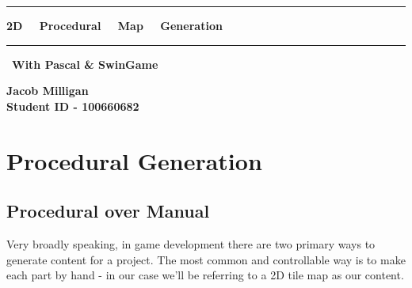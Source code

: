 \documentclass{article}
\begin{document}
\begin{titlepage}

\centering
\vspace*{0.3cm}

\Huge
\begin{mdframed}[backgroundcolor=lightgray,linecolor=lightgray]
\centering
\vspace{7mm}
\rule{\textwidth}{2mm}

\textbf{2D \ \ Procedural \ \ Map \ \ Generation} 

\vspace{3mm}

\rule{\textwidth}{2mm}
\huge
\vfill
\
\textbf{With Pascal \& SwinGame}
\vspace{7mm}
\end{mdframed}

\vfill


\vfill
\large
\textbf{Jacob Milligan \\ \small Student ID - 100660682}

\end{titlepage}

\clearpage

\tableofcontents

\clearpage

\section{Procedural Generation}

\subsection{Procedural over Manual}


Very broadly speaking, in game development there are two primary ways to generate content for a project. The most common and controllable way is to make each part by hand - in our case we'll be referring to a 2D tile map as our content.
		
\end{document}
